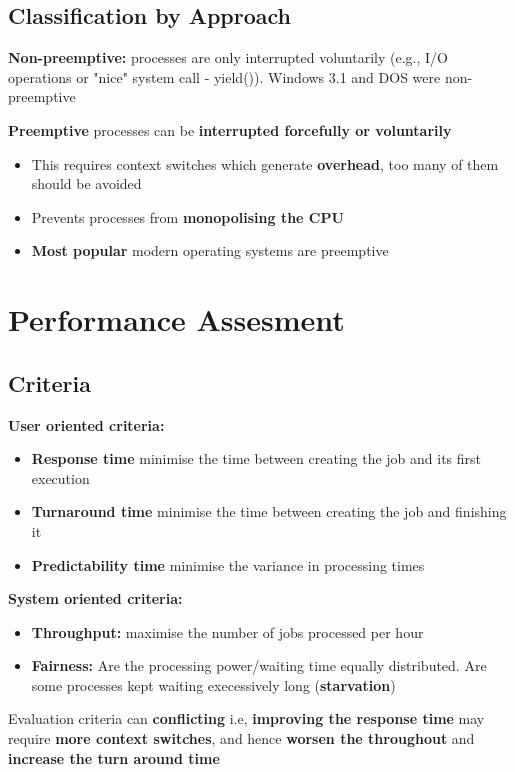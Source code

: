 \documentclass{article}
\begin{document}
\subsection{Classification by Approach}
\begin{flushleft}
\textbf{Non-preemptive:} processes are only interrupted voluntarily (e.g., I/O operations or "nice" system call - yield()). Windows 3.1 and DOS were non-preemptive

\textbf{Preemptive} processes can be \textbf{interrupted forcefully or voluntarily}
\begin{itemize}
	\item This requires context switches which generate \textbf{overhead}, too many of them should be avoided
	\item Prevents processes from \textbf{monopolising the CPU}
	\item \textbf{Most popular} modern operating systems are preemptive
\end{itemize}
\end{flushleft}

\section{Performance Assesment}

\subsection{Criteria}
\begin{flushleft}
\textbf{User oriented criteria:}
\begin{itemize}
	\item \textbf{Response time} minimise the time between creating the job and its first execution
	\item \textbf{Turnaround time} minimise the time between creating the job and finishing it
	\item \textbf{Predictability time} minimise the variance in processing times
\end{itemize}

\textbf{System oriented criteria:}
\begin{itemize}
	\item \textbf{Throughput:} maximise the number of jobs processed per hour
	\item \textbf{Fairness:} Are the processing power/waiting time equally distributed. Are some processes kept waiting execessively long (\textbf{starvation})
\end{itemize}
Evaluation criteria can \textbf{conflicting} i.e, \textbf{improving the response time} may require \textbf{more context switches}, and hence \textbf{worsen the throughout} and \textbf{increase the turn around time}
\end{flushleft}
\end{document}
